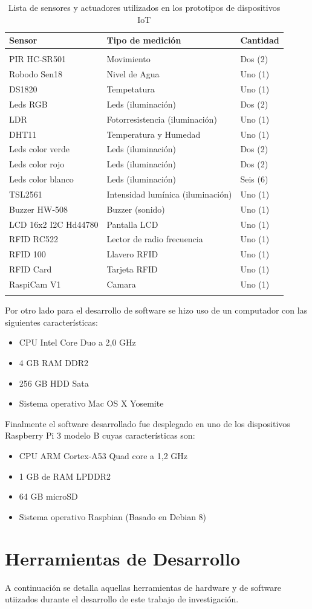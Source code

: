 \begin{longtable}[]{@{}lll@{}}
\toprule
Sensor & Tipo de medición & Cantidad\tabularnewline
\midrule
\endhead
\tabularnewline
PIR HC-SR501 & Movimiento & Dos (2)\tabularnewline
Robodo Sen18 & Nivel de Agua & Uno (1)\tabularnewline
DS1820 & Tempetatura & Uno (1)\tabularnewline
Leds RGB & Leds (iluminación) & Dos (2)\tabularnewline
LDR & Fotorresistencia (iluminación) & Uno (1)\tabularnewline
DHT11 & Temperatura y Humedad & Uno (1)\tabularnewline
Leds color verde & Leds (iluminación) & Dos (2)\tabularnewline
Leds color rojo & Leds (iluminación) & Dos (2)\tabularnewline
Leds color blanco & Leds (iluminación) & Seis (6)\tabularnewline
TSL2561 & Intensidad lumínica (iluminación) & Uno (1)\tabularnewline
Buzzer HW-508 & Buzzer (sonido)& Uno (1)\tabularnewline
LCD 16x2 I2C Hd44780 & Pantalla LCD & Uno (1)\tabularnewline
RFID RC522 & Lector de radio frecuencia & Uno (1)\tabularnewline
RFID 100 & Llavero RFID & Uno (1)\tabularnewline
RFID Card & Tarjeta RFID & Uno (1)\tabularnewline
RaspiCam V1 & Camara & Uno (1)\tabularnewline
\bottomrule
\caption{Lista de sensores y actuadores utilizados en los prototipos de dispositivos IoT}
\label{table:sensores}
\end{longtable}

Por otro lado para el desarrollo de software se hizo uso de un computador con las siguientes características:
\begin{itemize}
\item CPU Intel Core Duo a 2,0 GHz
\item 4 GB RAM DDR2
\item 256 GB HDD Sata
\item Sistema operativo Mac OS X Yosemite
\end{itemize}

Finalmente el software desarrollado fue desplegado en uno de los dispositivos Raspberry Pi 3 modelo B cuyas características son:
\begin{itemize}
\item CPU ARM Cortex-A53 Quad core a 1,2 GHz
\item 1 GB de RAM LPDDR2
\item 64 GB microSD 
\item Sistema operativo Raspbian (Basado en Debian 8) 
\end{itemize}

\section{Herramientas de Desarrollo}
A continuación se detalla aquellas herramientas de hardware y de software utiizados durante el desarrollo de este trabajo de investigación.

